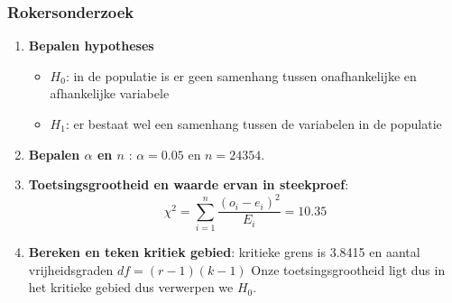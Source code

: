 \documentclass[aspectratio=169]{beamer}
\begin{document}
\begin{frame}
  \frametitle{Rokersonderzoek}
  \begin{enumerate}
  \item \textbf{Bepalen hypotheses}
    \begin{itemize}
      \item $H_{0}$: in de populatie is er geen samenhang tussen onafhankelijke en afhankelijke variabele
      \item $H_{1}$: er bestaat wel een samenhang tussen de variabelen in de populatie
    \end{itemize}
  \item \textbf{Bepalen $\alpha$ en $n$} : $\alpha = 0.05$ en $n = 24354$.
  \item \textbf{Toetsingsgrootheid en waarde ervan in steekproef}:
  \[ \chi^{2} = \sum_{i=1}^{n} \frac{(o_{i} - e_{i})^{2}}{E_{i}} = 10.35 \]
  \item \textbf{Bereken en teken kritiek gebied}:  kritieke grens is 3.8415 en aantal vrijheidsgraden $df = (r-1)(k-1)$ Onze toetsingsgrootheid ligt dus in het kritieke gebied dus verwerpen we $H_{0}$.
\end{enumerate}
\end{frame}
\end{document}
